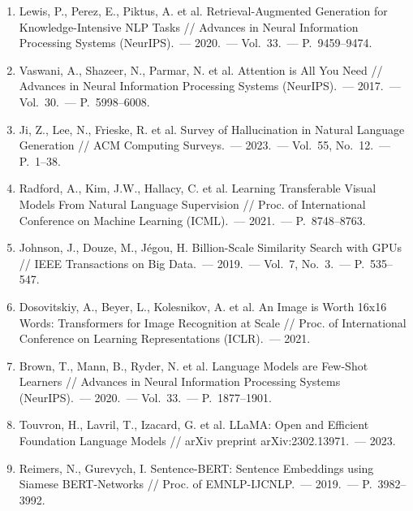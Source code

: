 \documentclass[a4paper,12pt]{article}
\begin{document}
\begin{enumerate}
    \item Lewis, P., Perez, E., Piktus, A. et al. Retrieval-Augmented Generation for Knowledge-Intensive NLP Tasks // Advances in Neural Information Processing Systems (NeurIPS).~--- 2020.~--- Vol.~33.~--- P.~9459--9474. \label{ref:lewis2020rag}

    \item Vaswani, A., Shazeer, N., Parmar, N. et al. Attention is All You Need // Advances in Neural Information Processing Systems (NeurIPS).~--- 2017.~--- Vol.~30.~--- P.~5998--6008. \label{ref:vaswani2017attention}

    \item Ji, Z., Lee, N., Frieske, R. et al. Survey of Hallucination in Natural Language Generation // ACM Computing Surveys.~--- 2023.~--- Vol.~55, No.~12.~--- P.~1--38. \label{ref:ji2023hallucination}

    \item Radford, A., Kim, J.W., Hallacy, C. et al. Learning Transferable Visual Models From Natural Language Supervision // Proc. of International Conference on Machine Learning (ICML).~--- 2021.~--- P.~8748--8763. \label{ref:radford2021clip}

    \item Johnson, J., Douze, M., Jégou, H. Billion-Scale Similarity Search with GPUs // IEEE Transactions on Big Data.~--- 2019.~--- Vol.~7, No.~3.~--- P.~535--547. \label{ref:johnson2019faiss}

    \item Dosovitskiy, A., Beyer, L., Kolesnikov, A. et al. An Image is Worth 16x16 Words: Transformers for Image Recognition at Scale // Proc. of International Conference on Learning Representations (ICLR).~--- 2021. \label{ref:dosovitskiy2021vit}

    \item Brown, T., Mann, B., Ryder, N. et al. Language Models are Few-Shot Learners // Advances in Neural Information Processing Systems (NeurIPS).~--- 2020.~--- Vol.~33.~--- P.~1877--1901. \label{ref:brown2020gpt3}

    \item Touvron, H., Lavril, T., Izacard, G. et al. LLaMA: Open and Efficient Foundation Language Models // arXiv preprint arXiv:2302.13971.~--- 2023. \label{ref:touvron2023llama}

    \item Reimers, N., Gurevych, I. Sentence-BERT: Sentence Embeddings using Siamese BERT-Networks // Proc. of EMNLP-IJCNLP.~--- 2019.~--- P.~3982--3992. \label{ref:reimers2019sentencebert}


\end{enumerate}
\end{document}
